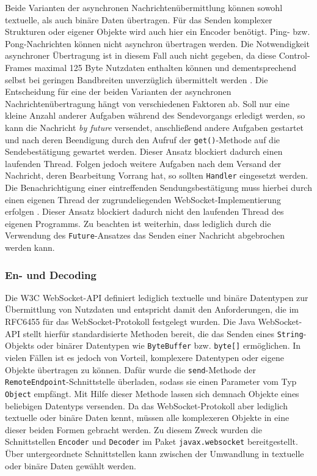 \documentclass[11pt,a4paper,titlepage]{scrartcl}
\numberwithin{equation}{section}
\begin{document}
\noindent Beide Varianten der asynchronen Nachrichtenübermittlung können sowohl textuelle, als auch binäre Daten übertragen. Für das Senden komplexer Strukturen oder eigener Objekte wird auch hier ein Encoder benötigt. Ping- bzw. Pong-Nachrichten können nicht asynchron übertragen werden. Die Notwendigkeit asynchroner Übertragung ist in diesem Fall auch nicht gegeben, da diese Control-Frames maximal 125 Byte Nutzdaten enthalten können und dementsprechend selbst bei geringen Bandbreiten unverzüglich übermittelt werden \autocite[120]{coward_java_2014}. Die Entscheidung für eine der beiden Varianten der asynchronen Nachrichtenübertragung hängt von verschiedenen Faktoren ab. Soll nur eine kleine Anzahl anderer Aufgaben während des Sendevorgangs erledigt werden, so kann die Nachricht \textit{by future} versendet, anschließend andere Aufgaben gestartet und nach deren Beendigung durch den Aufruf der \texttt{get()}-Methode auf die Sendebestätigung gewartet werden. Dieser Ansatz blockiert dadurch einen laufenden Thread. Folgen jedoch weitere Aufgaben nach dem Versand der Nachricht, deren Bearbeitung Vorrang hat, so sollten \texttt{Handler} eingesetzt werden. Die Benachrichtigung einer eintreffenden Sendungsbestätigung muss hierbei durch einen eigenen Thread der zugrundeliegenden WebSocket-Implementierung erfolgen \autocite[123]{coward_java_2014}. Dieser Ansatz blockiert dadurch nicht den laufenden Thread des eigenen Programms. Zu beachten ist weiterhin, dass lediglich durch die Verwendung des \texttt{Future}-Ansatzes das Senden einer Nachricht abgebrochen werden kann.

\subsubsection{En- und Decoding}\label{subsubsec:DeEnCoding}
Die W3C WebSocket-API definiert lediglich textuelle und binäre Datentypen zur Übermittlung von Nutzdaten und entspricht damit den Anforderungen, die im RFC6455 für das WebSocket-Protokoll festgelegt wurden. Die Java WebSocket-API stellt hierfür standardisierte Methoden bereit, die das Senden eines \texttt{String}-Objekts oder binärer Datentypen wie \texttt{ByteBuffer} bzw. \texttt{byte[]} ermöglichen. In vielen Fällen ist es jedoch von Vorteil, komplexere Datentypen oder eigene Objekte übertragen zu können. Dafür wurde die \texttt{send}-Methode der \texttt{RemoteEndpoint}-Schnittstelle überladen, sodass sie einen Parameter vom Typ \texttt{Object} empfängt. Mit Hilfe dieser Methode lassen sich demnach Objekte eines beliebigen Datentyps versenden. Da das WebSocket-Protokoll aber lediglich textuelle oder binäre Daten kennt, müssen alle komplexeren Objekte in eine dieser beiden Formen gebracht werden. Zu diesem Zweck wurden die Schnittstellen \texttt{Encoder} und \texttt{Decoder} im Paket \texttt{javax.websocket} bereitgestellt. Über untergeordnete Schnittstellen kann zwischen der Umwandlung in textuelle oder binäre Daten gewählt werden. \medskip
\end{document}
